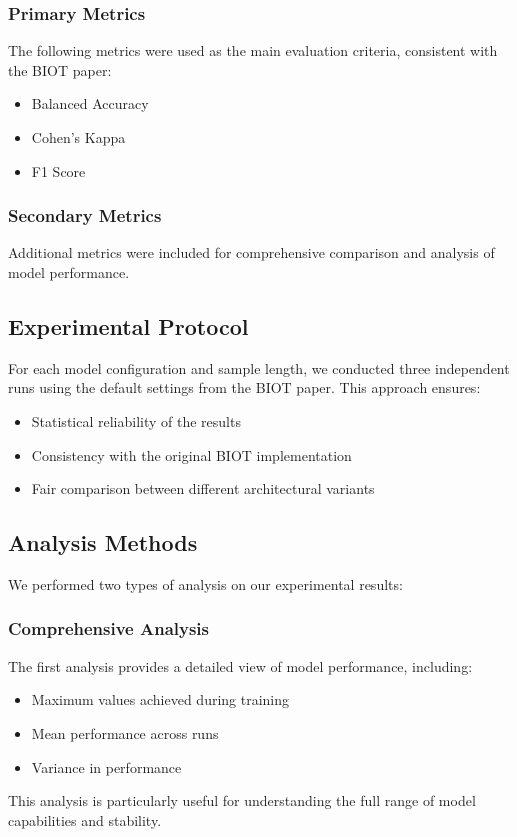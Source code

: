 \subsubsection{Primary Metrics}
The following metrics were used as the main evaluation criteria, consistent with the BIOT paper:
\begin{itemize}
    \item Balanced Accuracy
    \item Cohen's Kappa
    \item F1 Score
\end{itemize}

\subsubsection{Secondary Metrics}
Additional metrics were included for comprehensive comparison and analysis of model performance.

\subsection{Experimental Protocol}
For each model configuration and sample length, we conducted three independent runs using the default settings from the BIOT paper. This approach ensures:
\begin{itemize}
    \item Statistical reliability of the results
    \item Consistency with the original BIOT implementation
    \item Fair comparison between different architectural variants
\end{itemize}

\subsection{Analysis Methods}
We performed two types of analysis on our experimental results:

\subsubsection{Comprehensive Analysis}
The first analysis provides a detailed view of model performance, including:
\begin{itemize}
    \item Maximum values achieved during training
    \item Mean performance across runs
    \item Variance in performance
\end{itemize}
This analysis is particularly useful for understanding the full range of model capabilities and stability.

